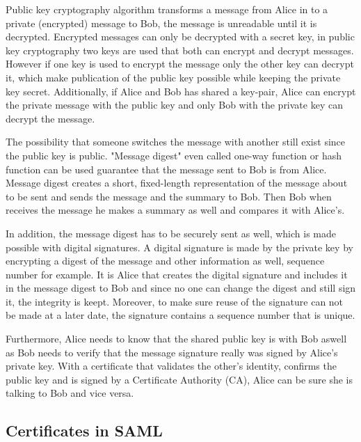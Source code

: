 Public key cryptography algorithm transforms a message from Alice in to a private (encrypted) message to Bob, 
the message is unreadable until it is decrypted. 
Encrypted messages can only be decrypted with a secret key, in public key cryptography two keys are used that both can encrypt and 
decrypt messages. 
However if one key is used to encrypt the message only the other key can decrypt it, which make publication of the public key 
possible while keeping the private key secret. 
Additionally, if Alice and Bob has shared a key-pair, Alice can encrypt the private message with the public key and only Bob 
with the private key can decrypt the message.

The possibility that someone switches the message with another still exist since the public 
key is public. "Message digest" even called one-way function or hash function can be used guarantee that the message sent to Bob is 
from Alice. Message digest creates a short, fixed-length representation of the message about to be sent and sends the message and
the summary to Bob.
Then Bob when receives the message he makes a summary as well and compares it with Alice's.

In addition, the message digest has to be securely sent as well, which is made possible with digital signatures. A digital signature
is made by the private key by encrypting a digest of the message and other information as well, sequence number for example.
It is Alice that creates the digital signature and includes it in the message digest to Bob and since no one can change the digest and still 
sign it, the integrity is keept. Moreover, to make sure reuse of the signature can not be made at a later date, the signature contains a 
sequence number that is unique. 

Furthermore, Alice needs to know that the shared public key is with Bob aswell as Bob needs to verify that the message signature 
really was signed by Alice's private key. With a certificate that validates the other's identity, confirms the public key and
is signed by a Certificate Authority (CA), Alice can be sure she is talking to Bob and vice versa.

\subsection{Certificates in SAML}

